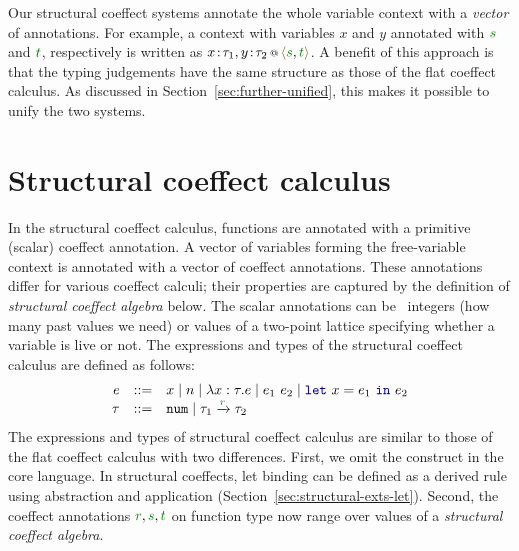Our structural coeffect systems annotate the whole variable context with a \emph{vector} of annotations.
For example, a context with variables $x$ and $y$ annotated with $\cclrd{s}$ and $\cclrd{t}$,
respectively is written as $\coctx{x\!:\!\tau_1,y\!:\!\tau_2}{\alift{\cclrd{s},\cclrd{t}}}$.
A benefit of this approach is that the typing judgements have the same structure as those of the
flat coeffect calculus. As discussed in Section~\ref{sec:further-unified}, this makes it possible to unify
the two systems.


%
%

\section{Structural coeffect calculus}
\label{sec:struct-calculus}

In the structural coeffect calculus, functions are annotated with a primitive (scalar) coeffect
annotation. A vector of variables forming the free-variable context is annotated with a vector of
coeffect annotations. These annotations differ for various coeffect calculi; their properties are
captured by the definition of \emph{structural coeffect algebra} below. The scalar annotations can
be \eg~integers (how many past values we need) or values of a two-point lattice specifying whether
a variable is live or not. The expressions and types of the structural coeffect calculus are defined
as follows:
%
\begin{equation*}
\begin{array}{rcl}
e &::=& x \sep n \sep \lambda x:\tau.e \sep e_1~e_2 \sep \kvd{let}~x = e_1~\kvd{in}~e_2\\
\tau &::=& \ident{num} \sep \tau_1 \xrightarrow{\cclrd{r}} \tau_2
\end{array}
\end{equation*}
%
The expressions and types of structural coeffect calculus are similar to those of the flat coeffect
calculus with two differences. First, we omit the  construct in the core language. In
structural coeffects, let binding can be defined as a derived rule using abstraction and application
(Section~\ref{sec:structural-exts-let}). Second, the coeffect annotations $\cclrd{r}, \cclrd{s}, \cclrd{t}$
on function type now range over values of a \emph{structural coeffect algebra}.

